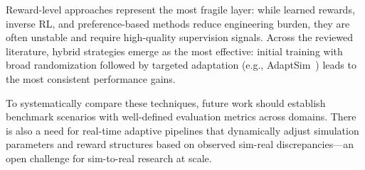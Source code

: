 Reward-level approaches represent the most fragile layer: while learned rewards, inverse RL, and preference-based methods reduce engineering burden, they are often unstable and require high-quality supervision signals. Across the reviewed literature, hybrid strategies emerge as the most effective: initial training with broad randomization followed by targeted adaptation (e.g., AdaptSim~\cite{Ren2023}) leads to the most consistent performance gains.

To systematically compare these techniques, future work should establish benchmark scenarios with well-defined evaluation metrics across domains. There is also a need for real-time adaptive pipelines that dynamically adjust simulation parameters and reward structures based on observed sim-real discrepancies—an open challenge for sim-to-real research at scale.